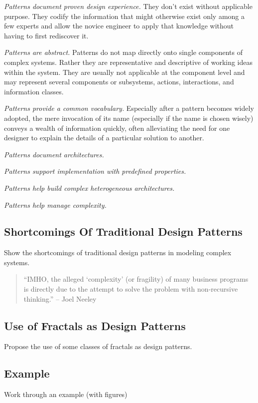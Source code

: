 \documentclass[jou,apacite]{apa6}
\begin{document}
\emph{Patterns document proven design experience.}  They don't exist without applicable purpose.  They codify the information that might otherwise exist only among a few experts and allow the novice engineer to apply that knowledge without having to first rediscover it.

\emph{Patterns are abstract.}  Patterns do not map directly onto single components of complex systems. Rather they are representative and descriptive of working ideas within the system.  They are usually not applicable at the component level and may represent several components or subsystems, actions, interactions, and information classes.

\emph{Patterns provide a common vocabulary.}  Especially after a pattern becomes widely adopted, the mere invocation of its name (especially if the name is chosen wisely) conveys a wealth of information quickly, often alleviating the need for one designer to explain the details of a particular solution to another.

\emph{Patterns document architectures.}

\emph{Patterns support implementation with predefined properties.}

\emph{Patterns help build complex heterogeneous architectures.}

\emph{Patterns help manage complexity.}

\subsection{Shortcomings Of Traditional Design Patterns}
Show the shortcomings of traditional design patterns in modeling complex systems.

\begin{quote}
``IMHO, the alleged `complexity' (or fragility) of many business programs is directly due to the attempt to solve the problem with non-recursive thinking.'' -- Joel Neeley
\end{quote}

\subsection{Use of Fractals as Design Patterns}
Propose the use of some classes of fractals as design patterns.

\subsection{Example} %
Work through an example (with figures)
\end{document}
